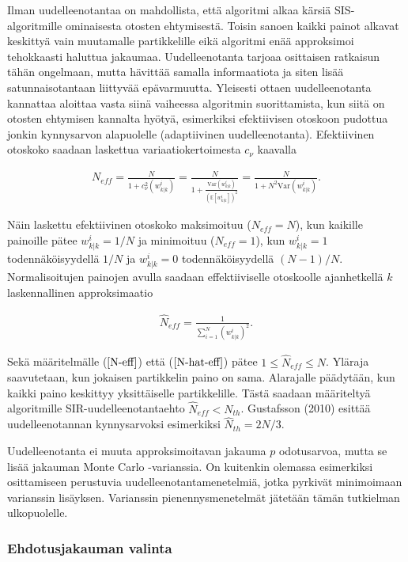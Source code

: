 \documentclass[
  12pt,
  a4paper, twoside]{book}
\begin{document}
Ilman uudelleenotantaa on mahdollista, että algoritmi alkaa kärsiä SIS-algoritmille ominaisesta otosten ehtymisestä. Toisin sanoen kaikki painot alkavat keskittyä vain muutamalle partikkelille eikä algoritmi enää approksimoi tehokkaasti haluttua jakaumaa. Uudelleenotanta tarjoaa osittaisen ratkaisun tähän ongelmaan, mutta hävittää samalla informaatiota ja siten lisää satunnaisotantaan liittyvää epävarmuutta. Yleisesti ottaen uudelleenotanta kannattaa aloittaa vasta siinä vaiheessa algoritmin suorittamista, kun siitä on otosten ehtymisen kannalta hyötyä, esimerkiksi efektiivisen otoskoon pudottua jonkin kynnysarvon alapuolelle (adaptiivinen uudelleenotanta). Efektiivinen otoskoko saadaan laskettua variaatiokertoimesta \(c_\nu\) kaavalla

\begin{align}\label{N-eff}
N_{eff}= \frac{N}{1+c_\nu^2(w^i_{k|k})} = \frac{N}{1+\frac{\text{Var}(w^i_{k|k})}{(\mathbb{E}[w^i_{k|k}])^2}} =\frac{N}{1+N^2\text{Var}(w^i_{k|k})}.
\end{align}

Näin laskettu efektiivinen otoskoko maksimoituu (\(N_{eff}=N\)), kun kaikille painoille pätee \(w^i_{k|k}=1/N\) ja minimoituu (\(N_{eff}=1\)), kun \(w^i_{k|k}=1\) todennäköisyydellä \(1/N\) ja \(w^i_{k|k}=0\) todennäköisyydellä \((N-1)/N\). Normalisoitujen painojen avulla saadaan effektiiviselle otoskoolle ajanhetkellä \(k\) laskennallinen approksimaatio

\begin{align}\label{N-hat-eff}
\hat{N}_{eff}=\frac{1}{\sum_{i=1}^N(w^i_{k|k})^2}.
\end{align}

Sekä määritelmälle (\(\ref{N-eff}\)) että (\(\ref{N-hat-eff}\)) pätee \(1 \leq \hat{N}_{eff} \leq N\). Yläraja saavutetaan, kun jokaisen partikkelin paino on sama. Alarajalle päädytään, kun kaikki paino keskittyy yksittäiselle partikkelille. Tästä saadaan määriteltyä algoritmille SIR-uudelleenotantaehto \(\hat{N}_{eff}< N_{th}\). Gustafsson (2010) \citep{gustafsson-2010} esittää uudelleenotannan kynnysarvoksi esimerkiksi \(\hat{N}_{th}=2N/3\).

Uudelleenotanta ei muuta approksimoitavan jakauma \(p\) odotusarvoa, mutta se lisää jakauman Monte Carlo -varianssia. On kuitenkin olemassa esimerkiksi osittamiseen perustuvia uudelleenotantamenetelmiä, jotka pyrkivät minimoimaan varianssin lisäyksen. Varianssin pienennysmenetelmät jätetään tämän tutkielman ulkopuolelle.

\subsubsection{Ehdotusjakauman valinta}
\end{document}
